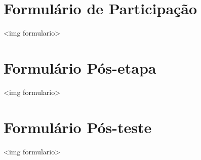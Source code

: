 \appendix
\chapter{Formulário de Participação}
\label{appendFormPortal}
<img formulario>

\chapter{Formulário Pós-etapa}
\label{appendFormStepPortal}
<img formulario>

\chapter{Formulário Pós-teste}
\label{appendFormFinalPortal}
<img formulario>